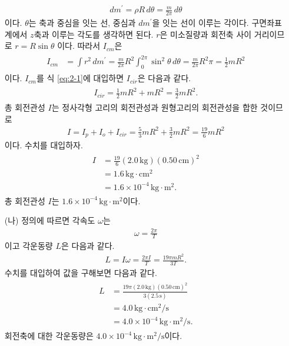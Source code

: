 \documentclass[floatfix,nofootinbib,superscriptaddress,fleqn]{revtex4-2}
\begin{document}
\begin{itemize}
\begin{align}
    dm^\prime = \rho R\,d\theta = \frac{m}{2\pi}\,d\theta
  \end{align}
  이다. $\theta$는 축과 중심을 잇는 선, 중심과 $dm^\prime$을 잇는 선이 이루는 각이다.
  구면좌표계에서 $z$축과 이루는 각도를 생각하면 된다. $r$은 미소질량과 회전축 사이 
  거리이므로 $r=R\sin\theta$ 이다. 따라서 $I_{cm}$은
  \begin{align}
    \begin{split}
      I_{cm} &= \int r^2\,dm^\prime = \frac{m}{2\pi}R^2
      \int_0^{2\pi}\sin^2\theta\,d\theta
      = \frac{m}{2\pi}R^2\pi = \frac{1}{2}mR^2
    \end{split}
  \end{align}
  이다. $I_{cm}$를 식 \eqref{eq:2-1}에 대입하면 $I_{cir}$은 다음과 같다.
  \begin{align}
    \begin{split}
      I_{cir} = \frac{1}{2}mR^2+mR^2 = \frac{3}{2}mR^2.
    \end{split}
  \end{align}
  총 회전관성 $I$는 정사각형 고리의 회전관성과 원형고리의 회전관성을 합한 것이므로
  \begin{align}
    I = I_p+I_o+I_{cir} = \frac{5}{3}mR^2+\frac{3}{2}mR^2=\frac{19}{6}mR^2
  \end{align}
  이다. 수치를 대입하자.
  \begin{align}
    \begin{split}
      I&=\frac{19}{6}(2.0\,\mathrm{kg})(0.50\,\mathrm{cm})^2  \\
      &= 1.6\,\mathrm{kg\cdot cm^2} \\
      &= 1.6\times 10^{-4}\,\mathrm{kg\cdot m^2} .
    \end{split}
  \end{align}
  총 회전관성 $I$는 $1.6\times 10^{-4}\,\mathrm{kg\cdot m^2}$이다.
  \item[(나)] 
  정의에 따르면 각속도 $\omega$는
  \begin{align}
    \omega = \frac{2\pi}{T}
  \end{align}
  이고 각운동량 $L$은 다음과 같다.
  \begin{align}
    L = I\omega = \frac{2\pi I}{T} = \frac{19\pi mR^2}{3T}.
  \end{align}
  수치를 대입하여 값을 구해보면 다음과 같다.
  \begin{align}
    \begin{split}
      L &=\frac{19\pi (2.0\,\mathrm{kg})(0.50\,\mathrm{cm})^2}
      {3(2.5\,\mathrm{s})}  \\
      &= 4.0\,\mathrm{kg\cdot cm^2/s} \\
      &= 4.0\times 10^{-4}\,\mathrm{kg\cdot m^2/s}.
    \end{split}
  \end{align}
  회전축에 대한 각운동량은 $4.0\times 10^{-4}\,\mathrm{kg\cdot m^2/s}$이다.
  \end{itemize}
\end{document}
